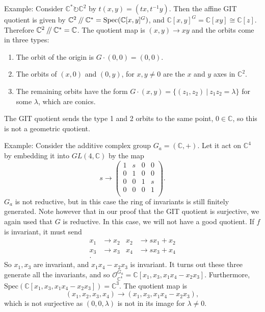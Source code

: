 \documentclass{article}
\theoremstyle{definition}
\theoremstyle{remark}
\numberwithin{theorem}{section}
\newcommand{\C}{\mathbb{C}}
\newcommand{\OO}{\mathcal{O}}
\newcommand{\sslash}{\mathbin{/\mkern-4mu/}}
\newcommand{\Spec}{\text{Spec}}
\begin{document}
Example: Consider $\C^\ast \circlearrowright \C^2$ by $t(x,y)=(tx, t^{-1}y)$. Then the affine GIT quotient is given by $\C^2\sslash \C^\ast = \Spec(\C[x,y]^G)$, and $\C[x,y]^G = \C[xy]\cong \C[z]$. Therefore $\C^2\sslash \C^\ast = \C$. The quotient map is $(x,y)\to xy$ and the orbits come in three types:
\begin{enumerate}
	\item The orbit of the origin is $G\cdot(0,0)=(0,0)$.
	\item The orbits of $(x,0)$ and $(0,y)$, for $x,y\neq 0$ are the $x$ and $y$ axes in $\C^2$.
	\item The remaining orbits have the form $G\cdot(x,y) = \{(z_1,z_2) ~|~ z_1z_2 = \lambda\}$ for some $\lambda$, which are conics.
\end{enumerate}
The GIT quotient sends the type 1 and 2 orbits to the same point, $0\in \C$, so this is not a geometric quotient. \vspace{1em}

Example: Consider the additive complex group $G_a = (\C,+)$. Let it act on $\C^4$ by embedding it into $GL(4,\C)$ by the map
\begin{equation}
	s \to \begin{pmatrix}
		1 & s & 0 & 0\\
		0 & 1 & 0 & 0\\
		0 & 0 & 1 & s\\
		0 & 0 & 0 & 1\\
	\end{pmatrix}.
\end{equation}
$G_a$ is not reductive, but in this case the ring of invariants is still finitely generated. Note however that in our proof that the GIT quotient is surjective, we again used that $G$ is reductive. In this case, we will not have a good quotient. If $f$ is invariant, it must send
\begin{align*}
	x_1 &\to x_2 & x_2 &\to sx_1 + x_2\\
	x_3 &\to x_3 & x_4 &\to sx_3 + x_4\\.
\end{align*}
So $x_1,x_3$ are invariant, and $x_1x_4-x_2x_3$ is invariant. It turns out these three generate all the invariants, and so $\OO_{\C^4}^{G_a} = \C[x_1,x_3,x_1x_4-x_2x_3]$. Furthermore, $\Spec(\C[x_1,x_3,x_1x_4-x_2x_3]) = \C^3$. The quotient map is 
\begin{equation}
	(x_1,x_2,x_3,x_4) \to (x_1,x_3,x_1x_4-x_2x_3),
\end{equation}
which is not surjective as $(0,0,\lambda)$ is not in its image for $\lambda\neq 0$.
\pagebreak
\end{document}
